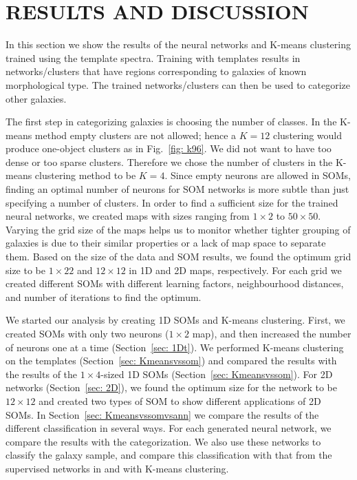 \section{RESULTS AND DISCUSSION}
\label{sec: result}

    In this section we show the results of the neural networks and K-means clustering trained using the  template spectra.
    Training with  templates results in networks/clusters that have regions corresponding to galaxies of known morphological type. 
    The trained networks/clusters can then be used to categorize other galaxies.

    The first step in categorizing galaxies is choosing the number of classes.
    In the K-means method empty clusters are not allowed; 
    hence a $K=12$ clustering would produce one-object clusters as in Fig.~\ref{fig: k96}.
    We did not want to have too dense or too sparse clusters.
    Therefore we chose the number of clusters in the K-means clustering method to be $K=4$.
    Since empty neurons are allowed in SOMs, finding an optimal number of neurons for SOM networks is more subtle than just specifying a number of clusters. 
    In order to find a sufficient size for the trained neural networks, we created maps with sizes ranging from $1\times2$ to $50\times50$.
    Varying the grid size of the maps helps us to monitor whether tighter grouping of galaxies is due to their similar properties or a lack of map space to separate them.
    Based on the size of the data and SOM results, we found the optimum grid size to be $1\times22$ and $12\times12$ in 1D and 2D maps, respectively. 
    For each grid we created different SOMs with different learning factors, neighbourhood distances, and number of iterations to find the optimum.
   
    We started our analysis by creating 1D SOMs and K-means clustering. 
    First, we created SOMs with only two neurons ($1\times2$ map), and then increased the number of neurons one at a time (Section~\ref{sec: 1Dt}).
    We performed K-means clustering on the  templates (Section~\ref{sec: Kmeansvssom}) and compared 
   the results with the results of the $1\times4$-sized 1D SOMs (Section~\ref{sec: Kmeansvssom}).
    For 2D networks (Section~\ref{sec: 2D}), we found the optimum size for the network to be $12\times12$ and created two types of SOM to show different applications of 2D SOMs.
    In Section~\ref{sec: Kmeansvssomvsann} we compare the results of the different classification in several ways. 
    For each generated neural network, we compare the results with the  categorization.
    We also use these networks to classify the  galaxy sample, and compare this classification with that from the supervised networks in  and with K-means clustering.



